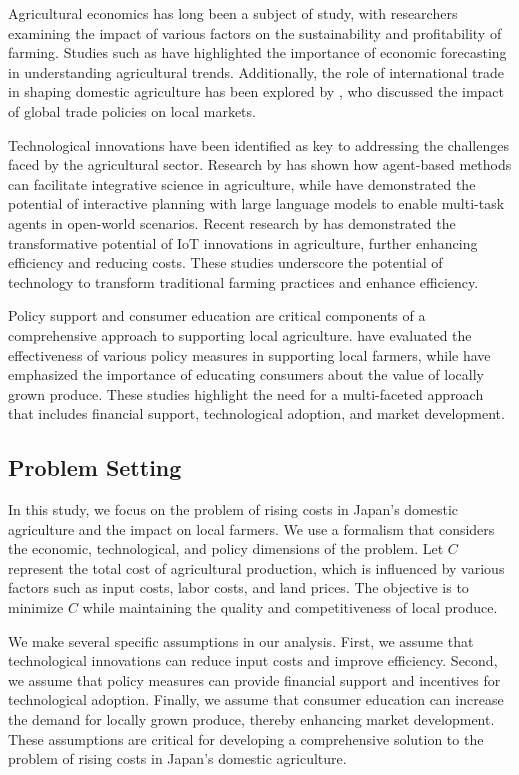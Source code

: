 \documentclass{article} %
\begin{document}
Agricultural economics has long been a subject of study, with researchers examining the impact of various factors on the sustainability and profitability of farming. Studies such as \citet{poledna2023economic} have highlighted the importance of economic forecasting in understanding agricultural trends. Additionally, the role of international trade in shaping domestic agriculture has been explored by \citet{zhou2023peer}, who discussed the impact of global trade policies on local markets.

Technological innovations have been identified as key to addressing the challenges faced by the agricultural sector. Research by \citet{west2023agent} has shown how agent-based methods can facilitate integrative science in agriculture, while \citet{wang2023describe} have demonstrated the potential of interactive planning with large language models to enable multi-task agents in open-world scenarios. Recent research by \citet{Parthasarathy2024ACS} has demonstrated the transformative potential of IoT innovations in agriculture, further enhancing efficiency and reducing costs. These studies underscore the potential of technology to transform traditional farming practices and enhance efficiency.

Policy support and consumer education are critical components of a comprehensive approach to supporting local agriculture. \citet{liu2023agentbench} have evaluated the effectiveness of various policy measures in supporting local farmers, while \citet{shanahan2023role} have emphasized the importance of educating consumers about the value of locally grown produce. These studies highlight the need for a multi-faceted approach that includes financial support, technological adoption, and market development.

\subsection{Problem Setting}

In this study, we focus on the problem of rising costs in Japan's domestic agriculture and the impact on local farmers. We use a formalism that considers the economic, technological, and policy dimensions of the problem. Let \( C \) represent the total cost of agricultural production, which is influenced by various factors such as input costs, labor costs, and land prices. The objective is to minimize \( C \) while maintaining the quality and competitiveness of local produce.

We make several specific assumptions in our analysis. First, we assume that technological innovations can reduce input costs and improve efficiency. Second, we assume that policy measures can provide financial support and incentives for technological adoption. Finally, we assume that consumer education can increase the demand for locally grown produce, thereby enhancing market development. These assumptions are critical for developing a comprehensive solution to the problem of rising costs in Japan's domestic agriculture.
\end{document}
